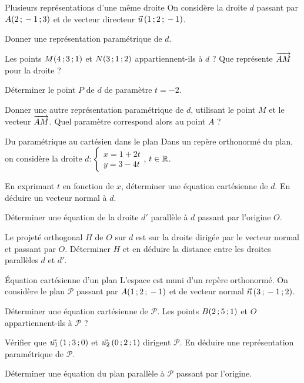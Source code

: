 \begin{exercice}[1]{Plusieurs représentations d'une même droite}
On considère la droite $d$ passant par $A(2\,{;}\,-1\,{;}\,3)$ et de vecteur directeur $\vec u\,(1\,{;}\,2\,{;}\,-1)$.
\begin{questions}
  \item Donner une représentation paramétrique de $d$.
  \item Les points $M(4\,{;}\,3\,{;}\,1)$ et $N(3\,{;}\,1\,{;}\,2)$ appartiennent-ils à $d$ ? Que représente $\overrightarrow{AM}$ pour la droite ?
  \item Déterminer le point $P$ de $d$ de paramètre $t=-2$.
  \item Donner une autre représentation paramétrique de $d$, utilisant le point $M$ et le vecteur $\overrightarrow{AM}$. Quel paramètre
    correspond alors au point $A$ ?
\end{questions}
\end{exercice}


\begin{exercice}[2]{Du paramétrique au cartésien dans le plan}
Dans un repère orthonormé du plan, on considère la droite $d:\begin{cases}x=1+2t\\y=3-4t\end{cases}$, $t\in\mathbb{R}$.
\begin{questions}
  \item En exprimant $t$ en fonction de $x$, déterminer une équation cartésienne de $d$. En déduire un vecteur normal à $d$.
  \item Déterminer une équation de la droite $d'$ parallèle à $d$ passant par l'origine $O$.
  \item Le projeté orthogonal $H$ de $O$ sur $d$ est sur la droite dirigée par le vecteur normal et passant par $O$. Déterminer $H$ et
    en déduire la distance entre les droites parallèles $d$ et $d'$.
\end{questions}
\end{exercice}

\begin{exercice}[2]{Équation cartésienne d'un plan}
L'espace est muni d'un repère orthonormé. On considère le plan $\mathcal{P}$ passant par $A(1\,{;}\,2\,{;}\,-1)$ et de vecteur normal
$\vec n\,(3\,{;}\,-1\,{;}\,2)$.
\begin{questions}
  \item Déterminer une équation cartésienne de $\mathcal{P}$. Les points $B(2\,{;}\,5\,{;}\,1)$ et $O$ appartiennent-ils à $\mathcal{P}$ ?
  \item Vérifier que $\vec{u_1}\,(1\,{;}\,3\,{;}\,0)$ et $\vec{u_2}\,(0\,{;}\,2\,{;}\,1)$ dirigent $\mathcal{P}$. En déduire une représentation
    paramétrique de $\mathcal{P}$.
  \item Déterminer une équation du plan parallèle à $\mathcal{P}$ passant par l'origine.
\end{questions}
\end{exercice}

